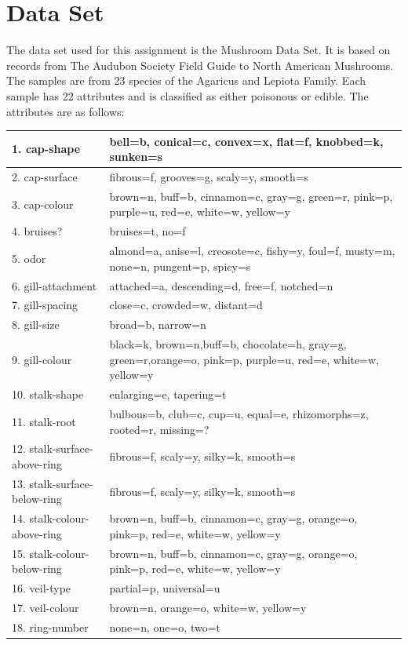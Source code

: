 \documentclass[12pt]{book}
\begin{document}
\section{Data Set}
The data set used for this assignment is the Mushroom Data Set.\cite{dataset}
It is based on records from The Audubon Society Field Guide to North American Mushrooms.
The samples are from 23 species of the Agaricus and Lepiota Family.
Each sample has 22 attributes and is classified as either poisonous or edible.
The attributes are as follows:
\begin{center}
\begin{tabularx}{\linewidth}{ |l|X| }
 \hline
 1. cap-shape & bell=b, conical=c, convex=x, flat=f, knobbed=k, sunken=s \\
 \hline
 2. cap-surface & fibrous=f, grooves=g, scaly=y, smooth=s \\
 \hline
 3. cap-colour & brown=n, buff=b, cinnamon=c, gray=g, green=r, pink=p, purple=u, red=e, white=w, yellow=y \\ \hline 4. bruises? & bruises=t, no=f \\
 \hline
 5. odor & almond=a, anise=l, creosote=c, fishy=y, foul=f, musty=m, none=n, pungent=p, spicy=s \\ \hline 6. gill-attachment & attached=a, descending=d, free=f, notched=n \\
 \hline
 7. gill-spacing & close=c, crowded=w, distant=d \\ \hline 8. gill-size & broad=b, narrow=n \\
 \hline
 9. gill-colour & black=k, brown=n,buff=b, chocolate=h, gray=g, green=r,orange=o, pink=p, purple=u, red=e, white=w, yellow=y \\
 \hline
 10. stalk-shape & enlarging=e, tapering=t \\ \hline 11. stalk-root & bulbous=b, club=c, cup=u, equal=e, rhizomorphs=z, rooted=r, missing=? \\
\hline
 12. stalk-surface-above-ring & fibrous=f, scaly=y, silky=k, smooth=s \\ \hline 13. stalk-surface-below-ring & fibrous=f, scaly=y, silky=k, smooth=s \\
\hline
 14. stalk-colour-above-ring & brown=n, buff=b, cinnamon=c, gray=g, orange=o, pink=p, red=e, white=w, yellow=y \\
\hline
 15. stalk-colour-below-ring & brown=n, buff=b, cinnamon=c, gray=g, orange=o, pink=p, red=e, white=w, yellow=y \\
\hline
 16. veil-type & partial=p, universal=u \\ \hline 17. veil-colour & brown=n, orange=o, white=w, yellow=y \\ \hline 18. ring-number & none=n, one=o, two=t \\

\end{tabularx}
\end{center}
\end{document}
